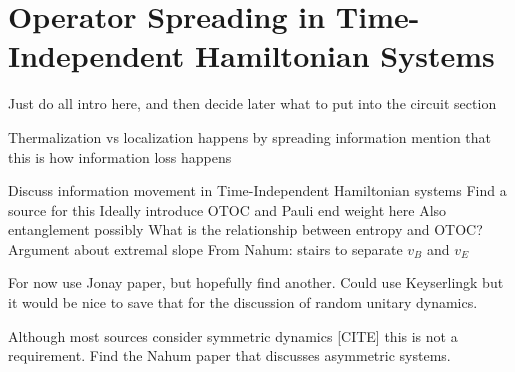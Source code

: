 \section{Operator Spreading in Time-Independent Hamiltonian Systems} \label{sec:opsp}

Just do all intro here, and then decide later what to put into the circuit section

Thermalization 
  vs localization 
  happens by spreading information
  mention that this is how information loss happens

Discuss information movement in Time-Independent Hamiltonian systems
  Find a source for this
  Ideally introduce OTOC and Pauli end weight here
  Also entanglement possibly
  What is the relationship between entropy and OTOC?
  Argument about extremal slope
    From Nahum: stairs to separate $v_B$ and $v_E$
    

For now use Jonay paper, but hopefully find another. Could use Keyserlingk but it would be nice to save that for the discussion of random unitary dynamics.

Although most sources consider symmetric dynamics [CITE] this is not a requirement. Find the Nahum paper that discusses asymmetric systems.